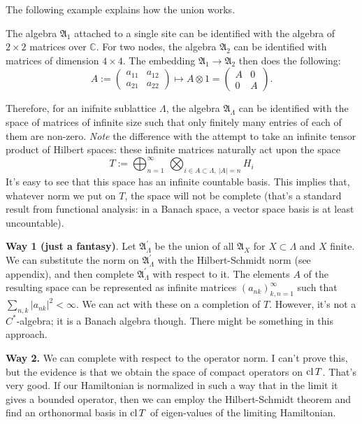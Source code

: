 The following example explains how the union works.
\begin{example}The algebra $\mathfrak A_{1}$ attached to a single site can be identified with the algebra of $2\times 2$ matrices over $\mathbb C$. For two nodes, the algebra $\mathfrak A_{2}$ can be identified with matrices of dimension $4 \times 4$. The embedding $\mathfrak A_{1} \rightarrow \mathfrak A_{2}$ then does the following:
\[
A:=\begin{pmatrix} a_{11} & a_{12}\\ a_{21} & a_{22}\end{pmatrix}
\mapsto A \otimes 1 = \begin{pmatrix} A & 0 \\ 0 & A\end{pmatrix}.
\]
\end{example}

Therefore, for an inifnite sublattice $\Lambda$, the algebra $\mathfrak A_{\Lambda}$ can be identified with the space of matrices of infinite size such that only finitely many entries of each of them are non-zero. \emph{Note} the difference with the attempt to take an infinite tensor product of Hilbert spaces: these infinite matrices naturally act upon the space 
\[
T:=\bigoplus_{n=1}^\infty \, \bigotimes_{i \in A \subset \Lambda, \ |A| = n} H_i 
\]
It's easy to see that this space has an infinite countable basis. This implies that, whatever norm we put on $T$, the space will not be complete (that's a standard result from functional analysis: in a Banach space, a vector space basis is at least uncountable).

\textbf{Way 1 (just a fantasy)}. Let $\mathfrak A_{\Lambda}^\prime$ be the union of all $\mathfrak A_X$ for $X \subset \Lambda$ and $X$ finite. We can substitute the norm on $\mathfrak A_{\Lambda}^\prime$ with the Hilbert-Schmidt norm (see appendix), and then complete $\mathfrak A_{\Lambda}^\prime$ with respect to it. The elements $A$ of the resulting space can be represented as infinite matrices $(a_{nk})_{k,n = 1}^{\infty}$ such that $\sum_{n,k} |a_{nk}|^2 < \infty$. We can act with these on a completion of $T$. However, it's not a $C^*$-algebra; it is a Banach algebra though. There might be something in this approach.

\textbf{Way 2.} We can complete with respect to the operator norm. I can't prove this, but the evidence is that we obtain the space of compact operators on $\operatorname{cl} T$. That's very good. If our Hamiltonian is normalized in such a way that in the limit it gives a bounded operator, then we can employ the Hilbert-Schmidt theorem and find an orthonormal basis in $\operatorname{cl} T$ of eigen-values of the limiting Hamiltonian. 

